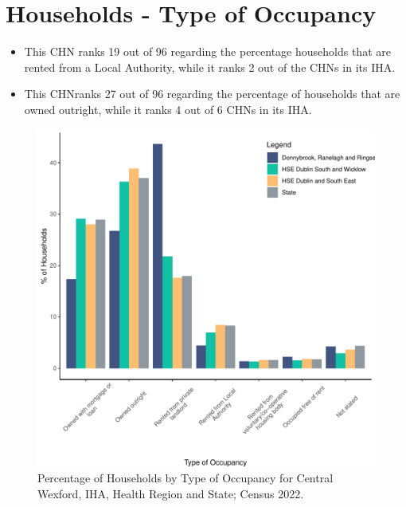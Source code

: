 \documentclass{article}
\begin{document}
\section{Households - Type of Occupancy}\label{sect:Households}
\begin{itemize}
\item This CHN ranks  19 out of 96 regarding the percentage households that are rented from a Local Authority, while it ranks  2 out of the CHNs in its IHA. 
\item This CHNranks  27 out of 96 regarding the percentage of households that are owned outright, while it ranks   4 out of 6 CHNs in its IHA.
\end{itemize}
\begin{figure}[H]
	\centering
	\includegraphics[width = 140mm]{../figures/HouseholdsED.pdf}
	\caption{Percentage of Households by Type of Occupancy for Central Wexford, IHA, Health Region and State; Census 2022.}
	\label{fig:vbnv}
	\end{figure}
\end{document}

